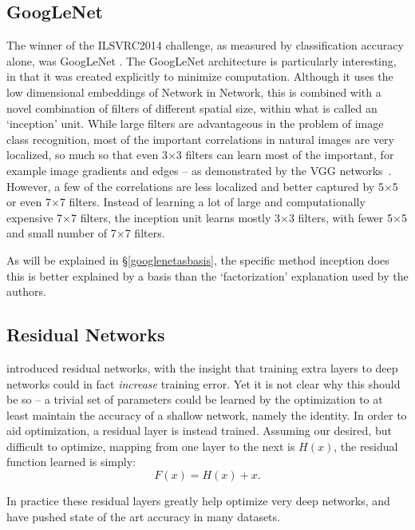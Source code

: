 \documentclass[thesis]{subfiles}
\begin{document}
\subsection{GoogLeNet}
The winner of the ILSVRC2014 challenge, as measured by classification accuracy alone, was GoogLeNet \citep{Szegedy2014going}. The GoogLeNet architecture is particularly interesting, in that it was created explicitly to minimize computation. Although it uses the low dimensional embeddings of Network in Network, this is combined with a novel combination of filters of different spatial size, within what is called an `inception' unit. While large filters are advantageous in the problem of image class recognition, most of the important correlations in natural images are very localized, so much so that even 3$\times$3 filters can learn most of the important, for example image gradients and edges -- as demonstrated by the VGG networks~\citep{Simonyan2014verydeep}. However, a few of the correlations are less localized and better captured by 5$\times$5 or even 7$\times$7 filters. Instead of learning a lot of large and computationally expensive 7$\times$7 filters, the inception unit learns mostly 3$\times$3 filters, with fewer 5$\times$5 and small number of 7$\times$7 filters. 

As will be explained in \S{\ref{googlenetasbasis}}, the specific method inception does this is better explained by a basis than the `factorization' explanation used by the authors.

\subsection{Residual Networks}
\citet{HeResnet2016} introduced residual networks, with the insight that training extra layers to deep networks could in fact \emph{increase} training error. Yet it is not clear why this should be so -- a trivial set of parameters could be learned by the optimization to at least maintain the accuracy of a shallow network, namely the identity. In order to aid optimization, a residual layer is instead trained. Assuming our desired, but difficult to optimize, mapping from one layer to the next is $H(x)$, the residual function learned is simply:
\begin{equation}
	F(x) = H(x) + x.
\end{equation}

In practice these residual layers greatly help optimize very deep networks, and have pushed state of the art accuracy in many datasets.
\end{document}
